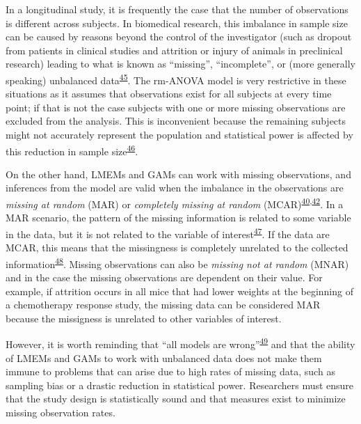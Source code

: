 \documentclass[
]{article}
\begin{document}
In a longitudinal study, it is frequently the case that the number of observations is different across subjects. In biomedical research, this imbalance in sample size can be caused by reasons beyond the control of the investigator (such as dropout from patients in clinical studies and attrition or injury of animals in preclinical research) leading to what is known as ``missing'', ``incomplete'', or (more generally speaking) unbalanced data\textsuperscript{\protect\hyperlink{ref-molenberghs2004}{45}}. The rm-ANOVA model is very restrictive in these situations as it assumes that observations exist for all subjects at every time point; if that is not the case subjects with one or more missing observations are excluded from the analysis. This is inconvenient because the remaining subjects might not accurately represent the population and statistical power is affected by this reduction in sample size\textsuperscript{\protect\hyperlink{ref-ma2012}{46}}.

On the other hand, LMEMs and GAMs can work with missing observations, and inferences from the model are valid when the imbalance in the observations are \emph{missing at random} (MAR) or \emph{completely missing at random} (MCAR)\textsuperscript{\protect\hyperlink{ref-west2014}{40},\protect\hyperlink{ref-weiss2005}{42}}. In a MAR scenario, the pattern of the missing information is related to some variable in the data, but it is not related to the variable of interest\textsuperscript{\protect\hyperlink{ref-scheffer2002}{47}}. If the data are MCAR, this means that the missingness is completely unrelated to the collected information\textsuperscript{\protect\hyperlink{ref-potthoff2006}{48}}. Missing observations can also be \emph{missing not at random} (MNAR) and in the case the missing observations are dependent on their value. For example, if attrition occurs in all mice that had lower weights at the beginning of a chemotherapy response study, the missing data can be considered MAR because the missigness is unrelated to other variables of interest.

However, it is worth reminding that ``all models are wrong''\textsuperscript{\protect\hyperlink{ref-box1976}{49}} and that the ability of LMEMs and GAMs to work with unbalanced data does not make them immune to problems that can arise due to high rates of missing data, such as sampling bias or a drastic reduction in statistical power. Researchers must ensure that the study design is statistically sound and that measures exist to minimize missing observation rates.
\end{document}
